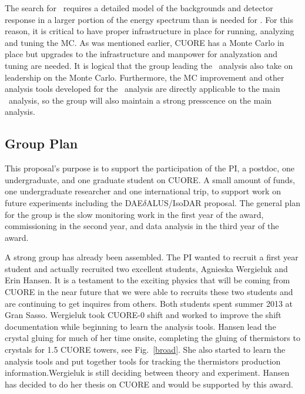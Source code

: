 The search for \maj~requires a detailed model of the backgrounds and detector response in a larger portion of the energy spectrum than is needed for \zeronu. For this reason, it is critical to have proper infrastructure in place for running, analyzing and tuning the MC. As was mentioned earlier, CUORE has a Monte Carlo in place but upgrades to the infrastructure and manpower for analyzation and tuning are needed. It is logical that the group leading the \maj~analysis also take on leadership on the Monte Carlo. Furthermore, the MC improvement and other analysis tools developed for the \maj~analysis are directly applicable to the main \zeronu~analysis, so the group will also maintain a strong presscence on the main analysis.

\subsection{Group Plan}
This proposal's purpose is to support the participation of the PI, a postdoc, one undergraduate, and one graduate student on CUORE. A small amount of funds, one undergraduate researcher and one international trip,  to support work on future experiments including the DAE$\delta$ALUS/IsoDAR proposal. The general plan for the group is the slow monitoring work in the first year of the award, commissioning in the second year, and data analysis in the third year of the award. 

A strong group has already been assembled. The PI wanted to recruit a first year student and actually recruited two excellent students, Agnieska Wergieluk and Erin Hansen. It is a testament to the exciting physics that will be coming from CUORE in the near future that we were able to recruits these two students and are continuing to get inquires from others. Both  students spent summer 2013 at Gran Sasso. Wergieluk took CUORE-0 shift and worked to improve the shift documentation while beginning to learn the analysis tools. Hansen lead the crystal gluing for much of her time onsite, completing the gluing of thermistors to crystals for 1.5 CUORE towers, see Fig.~\ref{broad}. She also started to learn the analysis tools and put together tools for tracking the thermistors production information.Wergieluk is still deciding between theory and experiment. Hansen has decided to do her thesis on CUORE and would be supported by this award.

